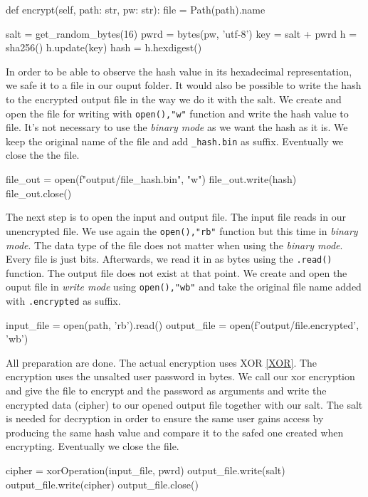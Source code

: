 \documentclass[]{article}
\begin{document}
\begin{python}
def encrypt(self, path: str, pw: str):
    file = Path(path).name

    salt = get_random_bytes(16) 
    pwrd = bytes(pw, 'utf-8')
    key = salt + pwrd
    h = sha256() 
    h.update(key) 
    hash = h.hexdigest()
\end{python}

In order to be able to observe the hash value in its hexadecimal representation, we safe it to a file in our ouput folder.
It would also be possible to write the hash to the encrypted output file in the way we do it with the salt. We create and open
the file for writing with \texttt{open(),"w"} function and write the hash value to file. It's not necessary to
use the \textit{binary mode} as we want the hash as it is. We keep the original name of the file and add 
\texttt{\_hash.bin} as suffix. Eventually we close the the file.

\begin{python}
file_out = open(f"output/{file}_hash.bin", "w")
file_out.write(hash)
file_out.close()
\end{python}

The next step is to open the input and output file. The input file reads in our unencrypted file. We use again
the \texttt{open(),"rb"} function but this time in \textit{binary mode}. The data type of the file
does not matter when using the \textit{binary mode}. Every file is just bits. Afterwards, we read it in as bytes 
using the \texttt{.read()} function. The output file does not exist at that point. We create and open the ouput file
in \textit{write mode} using \texttt{open(),"wb"} and take the original file name added with \texttt{.encrypted} as suffix.

\begin{python}
input_file = open(path, 'rb').read()
output_file = open(f'output/{file}.encrypted', 'wb')
\end{python}

All preparation are done. The actual encryption uses XOR \ref{XOR}.
The encryption uses the unsalted user password in bytes. We call our xor encryption and give the file to encrypt 
and the password as arguments and write the encrypted data (cipher) to our opened output 
file together with our salt. The salt is needed for decryption in order to ensure the same user gains access by
producing the same hash value and compare it to the safed one created when encrypting. Eventually we close the file.

\begin{python}
cipher = xorOperation(input_file, pwrd)
output_file.write(salt)
output_file.write(cipher)
output_file.close()
\end{python}
\end{document}
